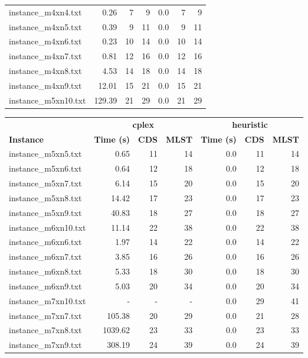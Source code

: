 \documentclass{article}
\begin{document}
\begin{center}
\begin{tabular}{lrrrrrr}
\\
instance\_m4xn4.txt & 0.26 & 7 & 9
 & 0.0 & 7 & 9
\\
instance\_m4xn5.txt & 0.39 & 9 & 11
 & 0.0 & 9 & 11
\\
instance\_m4xn6.txt & 0.23 & 10 & 14
 & 0.0 & 10 & 14
\\
instance\_m4xn7.txt & 0.81 & 12 & 16
 & 0.0 & 12 & 16
\\
instance\_m4xn8.txt & 4.53 & 14 & 18
 & 0.0 & 14 & 18
\\
instance\_m4xn9.txt & 12.01 & 15 & 21
 & 0.0 & 15 & 21
\\
instance\_m5xn10.txt & 129.39 & 21 & 29
 & 0.0 & 21 & 29
\\
\hline\end{tabular}
\end{center}
\newpage
\begin{center}
\renewcommand{\arraystretch}{1.4}
 \begin{tabular}{lrrrrrr}
	\hline
 & \multicolumn{3}{c}{\textbf{cplex}} & \multicolumn{3}{c}{\textbf{heuristic}}\\
\textbf{Instance}  & \textbf{Time (s)} & \textbf{CDS} & \textbf{MLST}   & \textbf{Time (s)} & \textbf{CDS} & \textbf{MLST}  \\\hline

instance\_m5xn5.txt & 0.65 & 11 & 14
 & 0.0 & 11 & 14
\\
instance\_m5xn6.txt & 0.64 & 12 & 18
 & 0.0 & 12 & 18
\\
instance\_m5xn7.txt & 6.14 & 15 & 20
 & 0.0 & 15 & 20
\\
instance\_m5xn8.txt & 14.42 & 17 & 23
 & 0.0 & 17 & 23
\\
instance\_m5xn9.txt & 40.83 & 18 & 27
 & 0.0 & 18 & 27
\\
instance\_m6xn10.txt & 11.14 & 22 & 38
 & 0.0 & 22 & 38
\\
instance\_m6xn6.txt & 1.97 & 14 & 22
 & 0.0 & 14 & 22
\\
instance\_m6xn7.txt & 3.85 & 16 & 26
 & 0.0 & 16 & 26
\\
instance\_m6xn8.txt & 5.33 & 18 & 30
 & 0.0 & 18 & 30
\\
instance\_m6xn9.txt & 5.03 & 20 & 34
 & 0.0 & 20 & 34
\\
instance\_m7xn10.txt & - & - & - 
 & 0.0 & 29 & 41
\\
instance\_m7xn7.txt & 105.38 & 20 & 29
 & 0.0 & 21 & 28
\\
instance\_m7xn8.txt & 1039.62 & 23 & 33
 & 0.0 & 23 & 33
\\
instance\_m7xn9.txt & 308.19 & 24 & 39
 & 0.0 & 24 & 39
\\
\hline\end{tabular}
\end{center}
\end{document}
